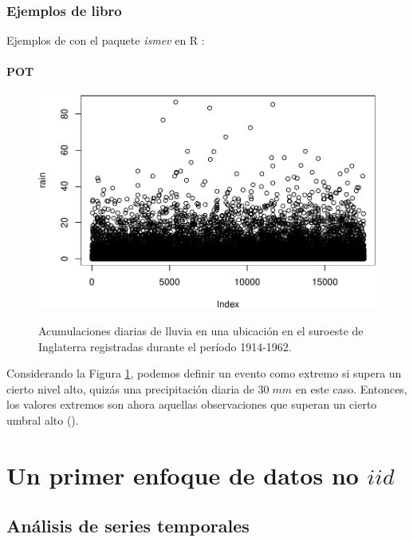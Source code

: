 \documentclass[
  20pt,
]{book}
\theoremstyle{definition}
\theoremstyle{definition}
\theoremstyle{definition}
\theoremstyle{definition}
\theoremstyle{remark}
\begin{document}
\subsection{Ejemplos de libro}\label{ejemplos-de-libro}

Ejemplos de \citet{coles2001introduction} con el paquete \emph{ismev} en R :

\subsubsection{POT}\label{pot}

\begin{figure}

{\centering \includegraphics[width=0.8\linewidth,alt={Acumulaciones diarias de lluvia en una ubicación en el suroeste de Inglaterra registradas durante el período 1914-1962.}]{Extremales_files/figure-latex/nice-fig3-1} 

}

\caption{Acumulaciones diarias de lluvia en una ubicación en el suroeste de Inglaterra registradas durante el período 1914-1962.}\label{fig:nice-fig3}
\end{figure}

Considerando la Figura \ref{fig:nice-fig3}, podemos definir un evento como extremo si supera un cierto nivel alto, quizás una precipitación diaria de \(30\; mm\) en este caso. Entonces, los valores extremos son ahora aquellas observaciones que superan un cierto umbral alto (\citet{coles2001introduction}).

\chapter{\texorpdfstring{Un primer enfoque de datos no \(iid\)}{Un primer enfoque de datos no iid}}\label{cross}

\section{Análisis de series temporales}\label{anuxe1lisis-de-series-temporales}
\end{document}
